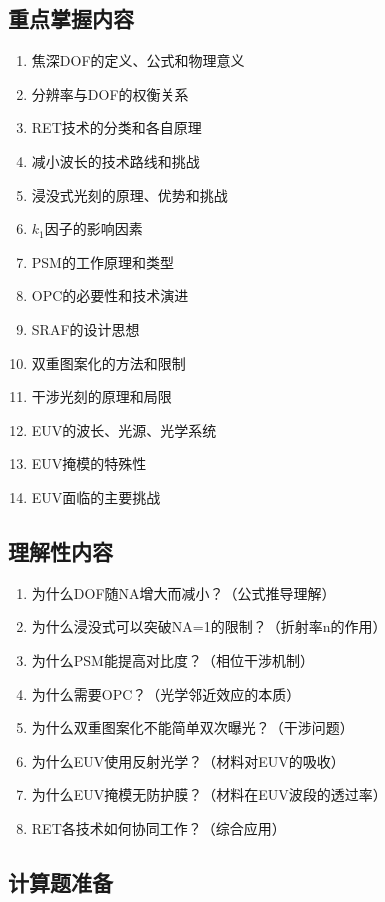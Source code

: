 \documentclass[UTF8,12pt,a4paper]{ctexart}
\begin{document}
\subsection{重点掌握内容}

\begin{enumerate}
    \item 焦深DOF的定义、公式和物理意义
    \item 分辨率与DOF的权衡关系
    \item RET技术的分类和各自原理
    \item 减小波长的技术路线和挑战
    \item 浸没式光刻的原理、优势和挑战
    \item $k_1$因子的影响因素
    \item PSM的工作原理和类型
    \item OPC的必要性和技术演进
    \item SRAF的设计思想
    \item 双重图案化的方法和限制
    \item 干涉光刻的原理和局限
    \item EUV的波长、光源、光学系统
    \item EUV掩模的特殊性
    \item EUV面临的主要挑战
\end{enumerate}

\subsection{理解性内容}

\begin{enumerate}
    \item 为什么DOF随NA增大而减小？（公式推导理解）
    \item 为什么浸没式可以突破NA=1的限制？（折射率n的作用）
    \item 为什么PSM能提高对比度？（相位干涉机制）
    \item 为什么需要OPC？（光学邻近效应的本质）
    \item 为什么双重图案化不能简单双次曝光？（干涉问题）
    \item 为什么EUV使用反射光学？（材料对EUV的吸收）
    \item 为什么EUV掩模无防护膜？（材料在EUV波段的透过率）
    \item RET各技术如何协同工作？（综合应用）
\end{enumerate}

\subsection{计算题准备}
\end{document}
